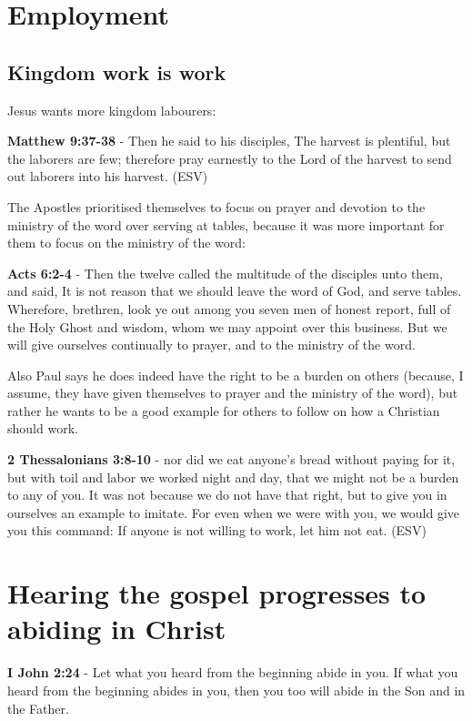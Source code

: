 \documentclass[11pt]{article}
\begin{document}
\section{Employment}
\label{sec:org4e804e1}
\subsection{Kingdom work \textbf{is} work}
\label{sec:org19a38ae}
Jesus wants more kingdom labourers:

\textbf{Matthew 9:37-38} - Then he said to his disciples, The harvest is plentiful, but the laborers are few; therefore pray earnestly to the Lord of the harvest to send out laborers into his harvest. (ESV)

The Apostles prioritised themselves to focus on prayer and devotion to the ministry of the word over serving at tables, because it was more important for them to focus on the ministry of the word:

\textbf{Acts 6:2-4} - Then the twelve called the multitude of the disciples unto them, and said, It is not reason that we should leave the word of God, and serve tables. Wherefore, brethren, look ye out among you seven men of honest report, full of the Holy Ghost and wisdom, whom we may appoint over this business. But we will give ourselves continually to prayer, and to the ministry of the word.

Also Paul says he does indeed have the right to be a burden on others (because, I assume, they have given themselves to prayer and the ministry of the word), but rather he wants to be a good example for others to follow on how a Christian should work.

\textbf{2 Thessalonians 3:8-10} - nor did we eat anyone's bread without paying for it, but with toil and labor we worked night and day, that we might not be a burden to any of you. It was not because we do not have that right, but to give you in ourselves an example to imitate. For even when we were with you, we would give you this command: If anyone is not willing to work, let him not eat. (ESV)

\section{Hearing the gospel progresses to abiding in Christ}
\label{sec:orgd2aac99}
\textbf{I John 2:24} - Let what you heard from the beginning abide in you. If what you heard from the beginning abides in you, then you too will abide in the Son and in the Father.
\end{document}
